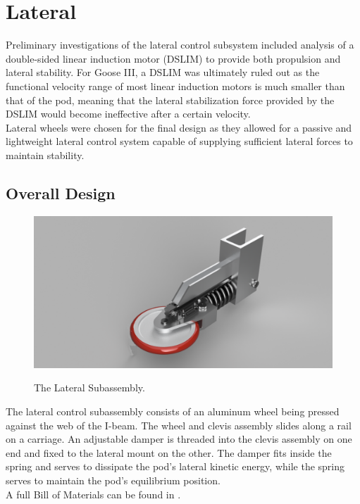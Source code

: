 \documentclass[main.tex]{subfiles}
\begin{document}
    \chapter{Lateral}
    \label{ch:lateral}
    
    Preliminary investigations of the lateral control subsystem included analysis of a double-sided linear induction motor (DSLIM) to provide both propulsion and lateral stability. For Goose III, a DSLIM was ultimately ruled out as the functional velocity range of most linear induction motors is much smaller than that of the pod, meaning that the lateral stabilization force provided by the DSLIM would become ineffective after a certain velocity.\\
    Lateral wheels were chosen for the final design as they allowed for a passive and lightweight lateral control system capable of supplying sufficient lateral forces to maintain stability.

    \section{Overall Design}
    \begin{figure}
    	\centering
        \includegraphics[width=\linewidth]{images/Lateral_Master}
        \label{fig:lateralMaster}
        \caption{The Lateral Subassembly.}
    \end{figure}
    The lateral control subassembly consists of an aluminum wheel being pressed against the web of the I-beam. The wheel and clevis assembly slides along a rail on a carriage. An adjustable damper is threaded into the clevis assembly on one end and fixed to the lateral mount on the other. The damper fits inside the spring and serves to dissipate the pod's lateral kinetic energy, while the spring serves to maintain the pod's equilibrium position.\\
    A full Bill of Materials can be found in .
\end{document}
